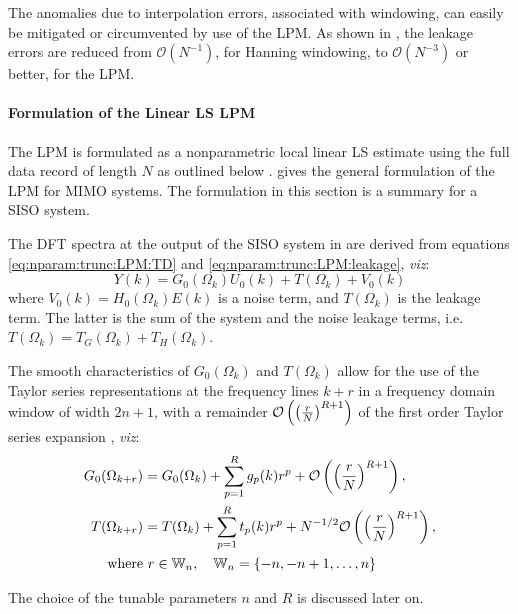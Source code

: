 The anomalies due to interpolation errors, associated with windowing, can easily be mitigated or circumvented by use of the \gls{LPM}. As shown in \citep{Pintelon2012}, the leakage errors are reduced from  $\mathcal{O}({N}^{-1})$, for Hanning windowing, to $\mathcal{O}({N}^{-3})$ or better, for the \gls{LPM}.


\paragraph{Formulation of the Linear LS LPM}
The \gls{LPM} is formulated as a nonparametric local linear \gls{LS} estimate using the full data record of length $N$ as outlined below \citep{Schoukens2009LPM}.
\citet[Section 7.2.2]{Pintelon2012} gives the general formulation of the \gls{LPM} for \gls{MIMO} systems.
The formulation in this section is a summary for a \gls{SISO} system.

The \gls{DFT} spectra at the output of the \gls{SISO} system in  are derived from equations \eqref{eq:nparam:trunc:LPM:TD} and \eqref{eq:nparam:trunc:LPM:leakage}, \emph{viz}:
\begin{equation}\label{lpm1spectra}
Y(k)=G_0(\Omega_k)U_0(k)+T(\Omega_k)+V_0(k)
\end{equation}
where $V_0(k) = H_0(\Omega_k)E(k)$ is a noise term, and $T(\Omega_k)$ is the leakage term. The latter is the sum of the system and the noise leakage terms, i.e. $T(\Omega_k) = T_G(\Omega_k) + T_H(\Omega_k)$.

The smooth characteristics of $G_0(\Omega_k)$ and $T(\Omega_k)$ allow for the use of the Taylor series representations at the frequency lines $k+r$ in a frequency domain window of width $2n+1$, with a remainder $\mathcal{O} \left( \left(\frac{r}{N}\right)^{R+1} \right)$ of the first order Taylor series expansion \citep{Schoukens2009LPM}, \emph{viz}:
\begin{align}\label{lpmGTaylorS}
G_0(\Omega_{k+r})&=G_0(\Omega_k)+\sum_{p=1}^{R}g_p(k)r^p+
\mathcal{O} \left( \left(\frac{r}{N}\right)^{R+1} \right),
\\
\label{lpmTTaylorS}
T(\Omega_{k+r})&=T(\Omega_k)+\sum_{p=1}^{R}t_p(k)r^p+N^{-1/2}
\mathcal{O} \left(   \left(\frac{r}{N}\right)^{R+1}   \right)
,
\\
\text{where}&\ r\in\mathbb{W}_n,\quad \mathbb{W}_n = \{-n,-n+1,\dots,n\}
\end{align}

The choice of the tunable parameters $n$ and $R$ is discussed later on.

